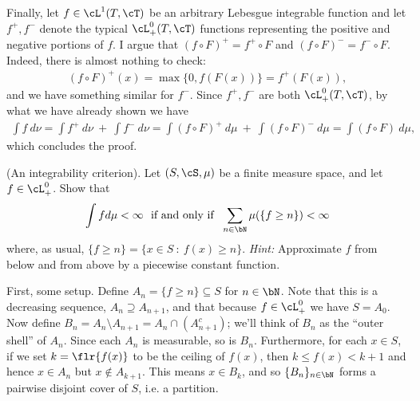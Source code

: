 \begin{homework}[e]
\begin{prf}
		Finally, let $f \in \cL^1(T,\cT)$ be an arbitrary Lebesgue integrable function and let $f^+,f^-$ denote the typical $\cL^0_+(T,\cT)$ functions representing the positive and negative portions of $f$. I argue that $(f\circ F)^+ = f^+\circ F$ and $(f\circ F)^- = f^-\circ F$. Indeed, there is almost nothing to check:
		\begin{align*}
			(f\circ F)^+(x) = \max\{0, f(F(x))\} = f^+(F(x)),
		\end{align*}
		and we have something similar for $f^-$. Since $f^+,f^-$ are both $\cL^0_+(T,\cT)$, by what we have already shown we have
		\begin{align*}
			\int f ~d\nu = \int f^+ ~d\nu ~+~ \int f^- ~d\nu = \int (f\circ F)^+ ~d\mu ~+~ \int (f\circ F)^- ~d\mu = \int (f\circ F) ~d\mu,
		\end{align*}
		which concludes the proof.
	\end{prf}
	 (An integrability criterion). Let $(S,\cS,\mu)$ be a finite measure space, and let $f \in \cL^0_+$. Show that 
	\begin{align*}
		\int f d\mu < \infty ~\text{ if and only if } ~ \sum_{n\in \bN} \mu(\{f \geq n\}) < \infty
	\end{align*}
	where, as usual, $\{f \geq n\} = \{x \in S ~:~ f(x) \geq n\}$. \small{\emph{Hint:} Approximate $f$ from below and from above by a piecewise constant function.}
	\begin{prf}
		First, some setup. Define $A_n = \{f \geq n\} \subseteq S$ for $n \in \bN$. Note that this is a decreasing sequence, $A_n \supseteq A_{n+1}$, and that because $f\in \cL_+^0$ we have $S = A_0$. Now define $B_n = A_n \setminus A_{n+1} = A_n \cap (A_{n+1}^c)$; we'll think of $B_n$ as the ``outer shell'' of $A_n$. Since each $A_n$ is measurable, so is $B_n$. Furthermore, for each $x \in S$, if we set $k = \flr{f(x)}$ to be the ceiling of $f(x)$, then $k \leq f(x) < k+1$ and hence $x \in A_n$ but $x \not\in A_{k+1}$. This means $x \in B_k$, and so $\{B_n\}_{n\in \bN}$ forms a pairwise disjoint cover of $S$, i.e. a partition.


\end{prf}
\end{homework}
